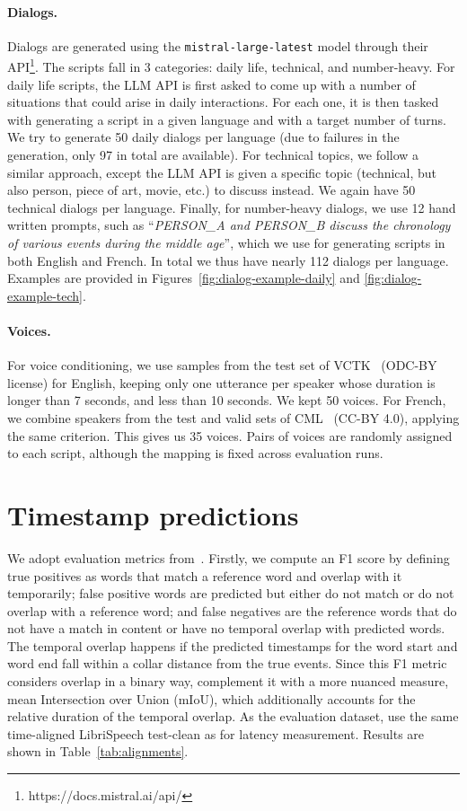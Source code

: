 \paragraph{Dialogs.}
Dialogs are generated using the \texttt{mistral-large-latest} model through their API\footnote{https://docs.mistral.ai/api/}. The scripts fall in 3 categories: daily life, technical, and number-heavy. For daily life scripts, the LLM API is first asked to come up with a number of situations that could arise in daily interactions. For each one, it is then tasked with generating a script in a given language and with a target number of turns. We try to generate 50 daily dialogs per language (due to failures in the generation, only 97 in total are available). For technical topics, we follow a similar approach, except the LLM API is given a specific topic (technical, but also person, piece of art, movie,  etc.) to discuss instead. We again have 50 technical dialogs per language. Finally, for number-heavy dialogs, we use 12 hand written prompts, such as ``\emph{PERSON\_A and PERSON\_B discuss the chronology of various events during the middle age}'', which we use for generating scripts in both English and French. In total we thus have nearly 112 dialogs per language. Examples are provided in Figures~\ref{fig:dialog-example-daily} and \ref{fig:dialog-example-tech}.

\paragraph{Voices.}
For voice conditioning, we use samples from the test set of VCTK~\citep{Yamagishi2019CSTRVC} (ODC-BY license) for English, keeping only one utterance per speaker whose duration is longer than 7 seconds, and less than 10 seconds. We kept 50 voices.
For French, we combine speakers from the test and valid sets of CML~\citep{Cmltts2023} (CC-BY 4.0), applying the same criterion. This gives us 35 voices.
Pairs of voices are randomly assigned to each script, although the mapping is fixed across evaluation runs.


\section{Timestamp predictions}
\label{sec:app:timestamps}

We adopt evaluation metrics from~\cite{crisper}. Firstly, we compute an F1 score by defining true positives as words that match a reference word and overlap with it temporarily; false positive words are predicted but either do not match or do not overlap with a reference word; and false negatives are the reference words that do not have a match in content or have no temporal overlap with predicted words. The temporal overlap happens if the predicted timestamps for the word start and word end fall within a collar distance from the true events. Since this F1 metric considers overlap in a binary way, \cite{crisper} complement it with a more nuanced measure, mean Intersection over Union (mIoU), which additionally accounts for the relative duration of the temporal overlap. %
As the evaluation dataset, use the same time-aligned LibriSpeech test-clean as for latency measurement. 
Results are shown in Table~\ref{tab:alignments}.

